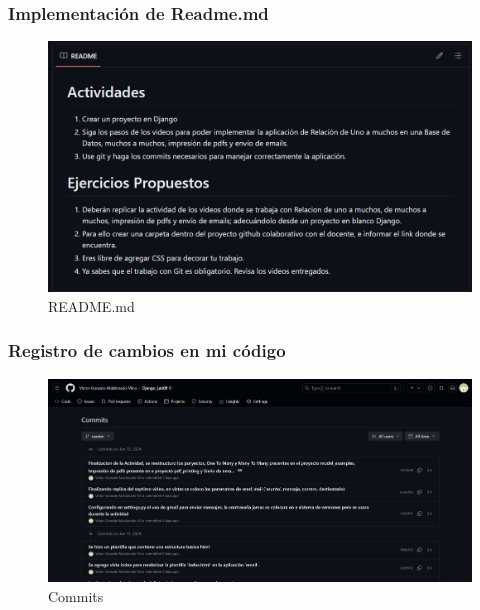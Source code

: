 \documentclass{article}
\begin{document}
  
  \subsubsection{Implementación de Readme.md}
    \begin{figure}[H]
      \centering
      \includegraphics[width=1\textwidth, keepaspectratio]{img/readme.png}
      \caption{README.md}
    \end{figure}
  

	\subsubsection{Registro de cambios en mi código}
    \begin{figure}[H]
      \centering
      \includegraphics[width=1\textwidth, keepaspectratio]{img/commits.png}
      \caption{Commits}
    \end{figure}
	
\end{document}
